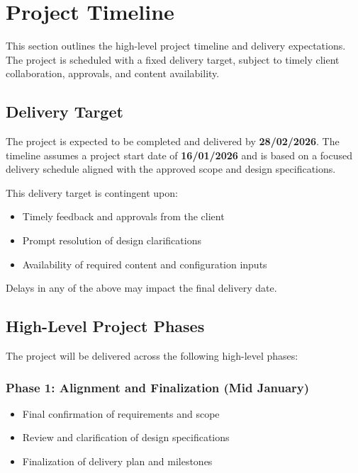 \section{Project Timeline}

This section outlines the high-level project timeline and delivery expectations.
The project is scheduled with a fixed delivery target, subject to timely client
collaboration, approvals, and content availability.

\subsection{Delivery Target}

The project is expected to be completed and delivered by \textbf{28/02/2026}. The timeline assumes a project start date of \textbf{16/01/2026} and
is based on a focused delivery schedule aligned with the approved scope and
design specifications.

This delivery target is contingent upon:
\begin{itemize}[leftmargin=1.5em]
    \item Timely feedback and approvals from the client
    \item Prompt resolution of design clarifications
    \item Availability of required content and configuration inputs
\end{itemize}

Delays in any of the above may impact the final delivery date.

\subsection{High-Level Project Phases}

The project will be delivered across the following high-level phases:

\subsubsection*{Phase 1: Alignment and Finalization (Mid January)}
\begin{itemize}[leftmargin=1.5em]
    \item Final confirmation of requirements and scope
    \item Review and clarification of design specifications
    \item Finalization of delivery plan and milestones
\end{itemize}

